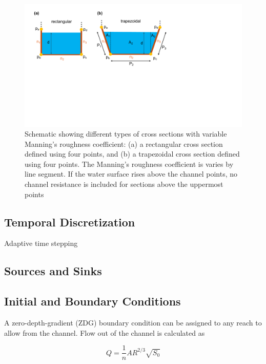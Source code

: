 \documentclass[fleqn]{article}
\begin{document}
\begin{figure}
	\centering
	\includegraphics[scale=0.5]{figures/cxs_rough.pdf}
	\caption[Schematic showing different types of channel cross sections with variable roughness.]{Schematic showing different types of cross sections with variable Manning's roughness coefficient: (a) a rectangular cross section defined using four points, and (b) a trapezoidal cross section defined using four points.  The Manning's roughness coefficient is varies by line segment.  If the water surface rises above the channel points, no channel resistance is included for sections above the uppermost points}
	\label{fig:cxs_rough}
\end{figure}


\subsection{Temporal Discretization}
Adaptive time stepping

\subsection{Sources and Sinks}

\subsection{Initial and Boundary Conditions}

A zero-depth-gradient (ZDG) boundary condition can be assigned to any reach to allow from the channel.  Flow out of the channel is calculated as

\begin{equation}
  Q = \frac{1}{n}A R^{2/3} \sqrt{S_0}
\end{equation}
\end{document}
